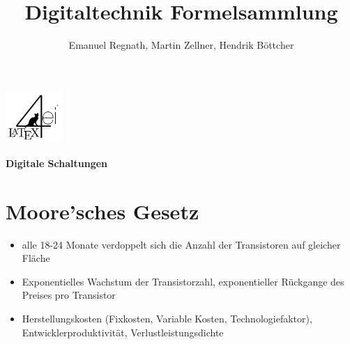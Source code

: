 \documentclass[6pt,a4paper]{scrartcl}
\title{Digitaltechnik Formelsammlung}
\author{Emanuel Regnath, Martin Zellner, Hendrik Böttcher}
\renewcommand{\emph}[1]{\textsf{\textbf{#1}}}
\begin{document}
\begin{multicols}{3}

\parbox{2.3cm}{
	\includegraphics[height=2cm]{./img/Logo.pdf}
}
\parbox{4cm}{
	\emph{\huge{Digitale Schaltungen}}
}

\section{Moore'sches Gesetz}
\begin{itemize} \itemsep0pt
	\item alle 18-24 Monate verdoppelt sich die Anzahl der Transistoren auf gleicher Fläche
	\item Exponentielles Wachstum der Transistorzahl, exponentieller Rückgange des Preises pro Transistor
	\item Herstellungskosten (Fixkosten, Variable Kosten, Technologiefaktor), Entwicklerproduktivität, Verlustleistungsdichte
\end{itemize}


\end{multicols}
\end{document}

